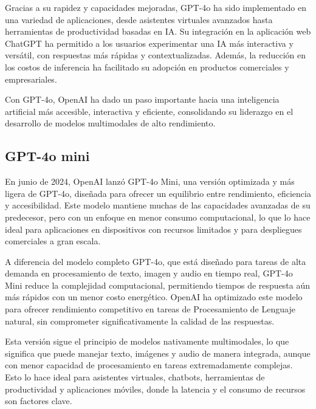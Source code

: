 Gracias a su rapidez y capacidades mejoradas, GPT-4o ha sido implementado en una variedad de aplicaciones, desde asistentes virtuales avanzados hasta herramientas de productividad basadas en IA. 
Su integración en la aplicación web ChatGPT ha permitido a los usuarios experimentar una IA más interactiva y versátil, con respuestas más rápidas y contextualizadas. 
Además, la reducción en los costos de inferencia ha facilitado su adopción en productos comerciales y empresariales.

Con GPT-4o, OpenAI ha dado un paso importante hacia una inteligencia artificial más accesible, interactiva y eficiente, consolidando su liderazgo en el desarrollo de modelos multimodales de alto rendimiento.


\subsection{GPT-4o mini}

En junio de 2024, OpenAI lanzó GPT-4o Mini, una versión optimizada y más ligera de GPT-4o, diseñada para ofrecer un equilibrio entre rendimiento, eficiencia y accesibilidad. 
Este modelo mantiene muchas de las capacidades avanzadas de su predecesor, pero con un enfoque en menor consumo computacional, lo que lo hace ideal para aplicaciones en dispositivos con recursos limitados y para despliegues comerciales a gran escala.

A diferencia del modelo completo GPT-4o, que está diseñado para tareas de alta demanda en procesamiento de texto, imagen y audio en tiempo real, GPT-4o Mini reduce la complejidad computacional, permitiendo tiempos de respuesta aún más rápidos con un menor costo energético. 
OpenAI ha optimizado este modelo para ofrecer rendimiento competitivo en tareas de Procesamiento de Lenguaje natural, sin comprometer significativamente la calidad de las respuestas.

Esta versión sigue el principio de modelos nativamente multimodales, lo que significa que puede manejar texto, imágenes y audio de manera integrada, aunque con menor capacidad de procesamiento en tareas extremadamente complejas. 
Esto lo hace ideal para asistentes virtuales, chatbots, herramientas de productividad y aplicaciones móviles, donde la latencia y el consumo de recursos son factores clave.

